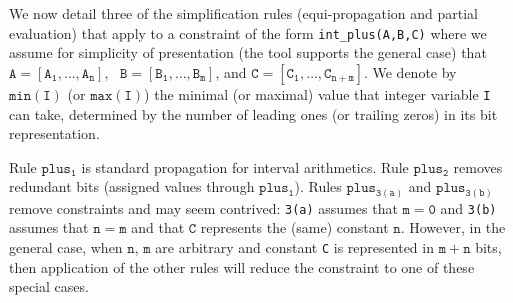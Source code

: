 \documentclass{tlp}
\begin{document}
We now detail three of the simplification rules (equi-propagation and
partial evaluation) that apply to a constraint of the form
\texttt{int\_plus(A,B,C)} where we assume for simplicity of
presentation (the tool supports the general case) that
$\mathtt{A=[A_1,\ldots,A_n]}$, ~$\mathtt{B=[B_1,\ldots,B_m]}$, and
$\mathtt{C=[C_1,\ldots,C_{n+m}]}$. We denote by $\mathtt{min(I)}$ (or
$\mathtt{max(I)}$) the minimal (or maximal) value that integer
variable \texttt{I} can take, determined by the number of leading ones
(or trailing zeros) in its bit representation.

Rule $\mathtt{plus_{1}}$ is standard propagation for interval
arithmetics.  Rule $\mathtt{plus_2}$ removes redundant bits 
(assigned values through $\mathtt{plus_{1}}$).
Rules $\mathtt{plus_{3(a)}}$ and $\mathtt{plus_{3(b)}}$ remove
constraints and may seem contrived: \texttt{{3(a)}} assumes that
$\mathtt{m=0}$ and \texttt{{3(b)}} assumes that $\mathtt{n=m}$ and
that $\mathtt{C}$ represents the (same) constant $\mathtt{n}$. 
However, in the general case, when $\mathtt{n}$, $\mathtt{m}$ are
arbitrary and constant \texttt{C} is represented in $\mathtt{m+n}$
bits, then application of the other rules will reduce the constraint
to one of these special cases.
\end{document}

